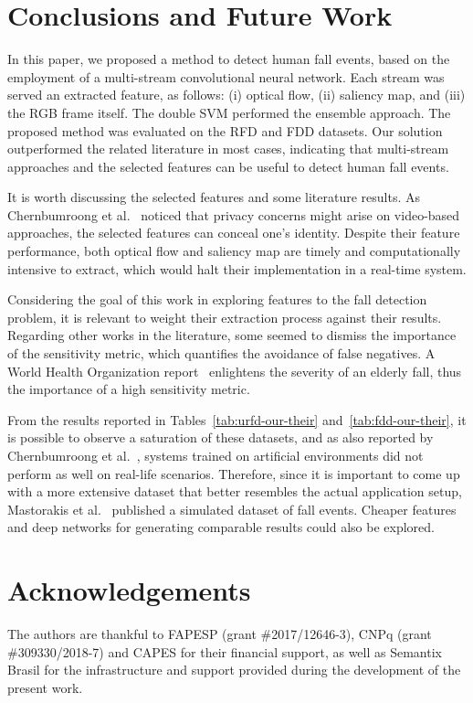 \documentclass[10pt, conference, compsocconf]{IEEEtran}
\begin{document}
\section{Conclusions and Future Work}
\label{sec:conclusion}

In this paper, we proposed a method to detect human fall events, based on the employment of a multi-stream convolutional neural network. Each stream was served an extracted feature, as follows: (i) optical flow, (ii) saliency map, and (iii) the RGB frame itself. The double SVM performed the ensemble approach. The proposed method was evaluated on the RFD and FDD datasets. Our solution outperformed the related literature in most cases, indicating that multi-stream approaches and the selected features can be useful to detect human fall events.

It is worth discussing the selected features and some literature results. As Chernbumroong et al.~\cite{chernbumroong2012elderly} noticed that privacy concerns might arise on video-based approaches, the selected features can conceal one's identity. Despite their feature performance, both optical flow and saliency map are timely and computationally intensive to extract, which would halt their implementation in a real-time system.

Considering the goal of this work in exploring features to the fall detection problem, it is relevant to weight their extraction process against their results. Regarding other works in the literature, some seemed to dismiss the importance of the sensitivity metric, which quantifies the avoidance of false negatives. A World Health Organization report~\cite{who2007report} enlightens the severity of an elderly fall, thus the importance of a high sensitivity metric.

From the results reported in Tables~\ref{tab:urfd-our-their} and~\ref{tab:fdd-our-their}, it is possible to observe a saturation of these datasets, and as also reported by Chernbumroong et al.~\cite{chernbumroong2012elderly}, systems trained on artificial environments did not perform as well on real-life scenarios. Therefore, since it is important to come up with a more extensive dataset that better resembles the actual application setup, Mastorakis et al.~\cite{mastorakis2018fall} published a simulated dataset of fall events. Cheaper features and deep networks for generating comparable results could also be explored.

\section*{Acknowledgements}

The authors are thankful to FAPESP (grant \#2017/12646-3), CNPq (grant \#309330/2018-7) and CAPES for their financial support, as well as Semantix Brasil for the infrastructure and support provided during the development of the present work.



\end{document}
